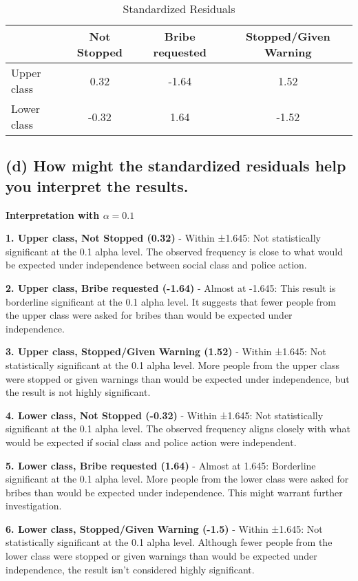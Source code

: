 \documentclass[12pt]{article}
\begin{document}
\begin{table}[H]
\centering
\caption{Standardized Residuals}
\begin{tabular}{lccc}
\toprule
                 & Not Stopped & Bribe requested & Stopped/Given Warning \\
\midrule
Upper class      & 0.32        & -1.64           & 1.52                  \\
Lower class      & -0.32       & 1.64            & -1.52                 \\
\bottomrule
\end{tabular}
\end{table}


\subsection{(d) How might the standardized residuals help you interpret the results.}

  \textbf{Interpretation with \(\alpha = 0.1\)
}

\textbf{1. Upper class, Not Stopped (0.32)}
   - Within ±1.645: Not statistically significant at the 0.1 alpha level. The observed frequency is close to what would be expected under independence between social class and police action.
  
\textbf{2. Upper class, Bribe requested (-1.64)}
   - Almost at -1.645: This result is borderline significant at the 0.1 alpha level. It suggests that fewer people from the upper class were asked for bribes than would be expected under independence.

\textbf{3. Upper class, Stopped/Given Warning (1.52)}
   - Within ±1.645: Not statistically significant at the 0.1 alpha level. More people from the upper class were stopped or given warnings than would be expected under independence, but the result is not highly significant.
  
\textbf{4. Lower class, Not Stopped (-0.32)}
   - Within ±1.645: Not statistically significant at the 0.1 alpha level. The observed frequency aligns closely with what would be expected if social class and police action were independent.

\textbf{5. Lower class, Bribe requested (1.64)}
   - Almost at 1.645: Borderline significant at the 0.1 alpha level. More people from the lower class were asked for bribes than would be expected under independence. This might warrant further investigation.
  
\textbf{6. Lower class, Stopped/Given Warning (-1.5)}
   - Within ±1.645: Not statistically significant at the 0.1 alpha level. Although fewer people from the lower class were stopped or given warnings than would be expected under independence, the result isn't considered highly significant.
\end{document}
